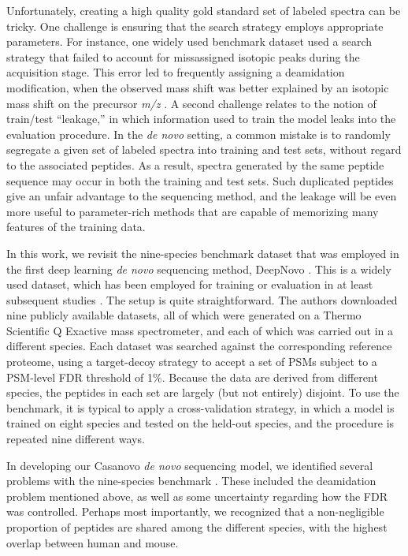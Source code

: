\documentclass{article}
\newcommand{\fixme}[1]{{\color{red}{\bf FIXME: #1}\color{black}}}
\begin{document}
Unfortunately, creating a high quality gold standard set of labeled spectra can be tricky.
One challenge is ensuring that the search strategy employs appropriate parameters.
For instance, one widely used benchmark dataset \cite{tran2017denovo} used a search strategy that failed to account for missassigned isotopic peaks during the acquisition stage.
This error led to frequently assigning a deamidation modification, when the observed mass shift was better explained by an isotopic mass shift on the precursor \textit{m/z} \cite{bittremieux:deep}.
A second challenge relates to the notion of train/test ``leakage,'' in which information used to train the model leaks into the evaluation procedure.
In the \textit{de novo} setting, a common mistake is to randomly segregate a given set of labeled spectra into training and test sets, without regard to the associated peptides.
As a result, spectra generated by the same peptide sequence may occur in both the training and test sets.
Such duplicated peptides give an unfair advantage to the sequencing method, and the leakage will be even more useful to parameter-rich methods that are capable of memorizing many features of the training data.

In this work, we revisit the nine-species benchmark dataset that was employed in the first deep learning \textit{de novo} sequencing method, DeepNovo \cite{trans2017denovo}.
This is a widely used dataset, which has been employed for training or evaluation in at least \fixme{XXX} subsequent studies \cite{XXX}.
The setup is quite straightforward.
The authors downloaded nine publicly available datasets, all of which were generated on a Thermo Scientific Q Exactive mass spectrometer, and each of which was carried out in a different species.
Each dataset was searched against the corresponding reference proteome, using a target-decoy strategy to accept a set of PSMs subject to a PSM-level FDR threshold of 1\%.
Because the data are derived from different species, the peptides in each set are largely (but not entirely) disjoint.
To use the benchmark, it is typical to apply a cross-validation strategy, in which a model is trained on eight species and tested on the held-out species, and the procedure is repeated nine different ways.

In developing our Casanovo \textit{de novo} sequencing model, we identified several problems with the nine-species benchmark \cite{yilmaz2023sequence}.
These included the deamidation problem mentioned above, as well as some uncertainty regarding how the FDR was controlled.
Perhaps most importantly, we recognized that a non-negligible proportion of peptides are shared among the different species, with the highest overlap between human and mouse.
\end{document}
